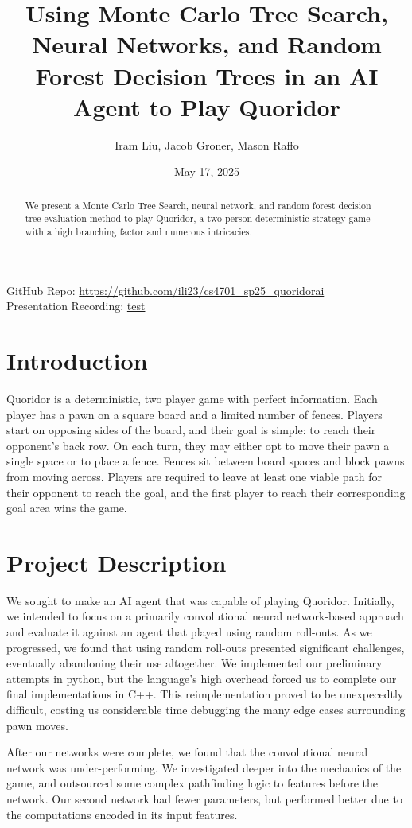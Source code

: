 \documentclass[10pt]{article}
\title{\bfseries Using Monte Carlo Tree Search, Neural Networks, and Random Forest Decision Trees in an AI Agent to Play Quoridor}
\author{
    Iram Liu, Jacob Groner, Mason Raffo
}
\date{May 17, 2025}
\newcommand{\githubLink}{\url{https://github.com/ili23/cs4701_sp25_quoridorai}}
\newcommand{\presentationLink}{\url{test}}
\begin{document}
\maketitle

\begin{abstract}We present a Monte Carlo Tree Search, neural network, and random forest decision tree evaluation method to play Quoridor, a two person deterministic strategy game with a high branching factor and numerous intricacies.
\end{abstract}
GitHub Repo: \githubLink \\
Presentation Recording: \presentationLink
\section{Introduction}
Quoridor is a deterministic, two player game with perfect information. Each player has a pawn on a square board and a limited number of fences. Players start on opposing sides of the board, and their goal is simple: to reach their opponent's back row. On each turn, they may either opt to move their pawn a single space or to place a fence. Fences sit between board spaces and block pawns from moving across. Players are required to leave at least one viable path for their opponent to reach the goal, and the first player to reach their corresponding goal area wins the game.

\section{Project Description}

We sought to make an AI agent that was capable of playing Quoridor. Initially, we intended to focus on a primarily convolutional neural network-based approach and evaluate it against an agent that played using random roll-outs. As we progressed, we found that using random roll-outs presented significant challenges, eventually abandoning their use altogether. We implemented our preliminary attempts in python, but the language's high overhead forced us to complete our final implementations in C++. This reimplementation proved to be unexpecedtly difficult, costing us considerable time debugging the many edge cases surrounding pawn moves.

After our networks were complete, we found that the convolutional neural network was under-performing. We investigated deeper into the mechanics of the game, and outsourced some complex pathfinding logic to features before the network. Our second network had fewer parameters, but performed better due to the computations encoded in its input features.
\end{document}
